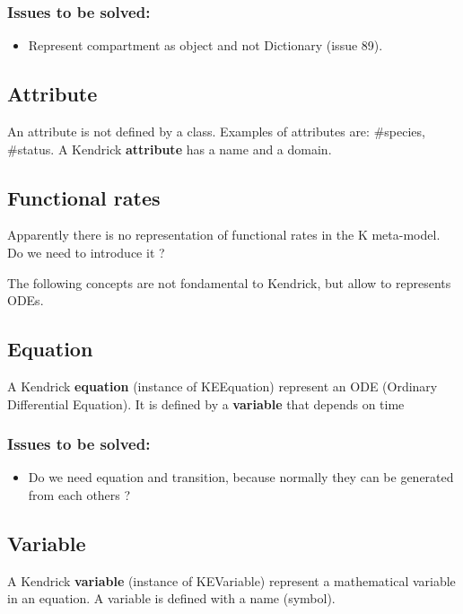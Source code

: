 \documentclass[11pt]{article}
\begin{document}
\subsubsection{Issues to be solved:}
\label{sec:orgb214871}
\begin{itemize}
\item Represent compartment as object and not Dictionary (issue 89).
\end{itemize}

\subsection{Attribute}
\label{sec:orgdf207ca}
An attribute is not defined by a class. Examples of attributes are: \#species, \#status.
A Kendrick \textbf{attribute} has a name and a domain.

\subsection{Functional rates}
\label{sec:org4dd5f83}
Apparently there is no representation of functional rates in the K meta-model.
Do we need to introduce it ?

The following concepts are not fondamental to Kendrick, but allow to represents ODEs.
\subsection{Equation}
\label{sec:org392f406}
A Kendrick \textbf{equation} (instance of KEEquation) represent an ODE (Ordinary Differential Equation). It is defined by a \textbf{variable} that depends on time 

\subsubsection{Issues to be solved:}
\label{sec:org19a4a5c}
\begin{itemize}
\item Do we need equation and transition, because normally they can be generated from each others ?
\end{itemize}

\subsection{Variable}
\label{sec:org5759923}
   A Kendrick \textbf{variable} (instance of KEVariable) represent a mathematical variable in an equation.
A variable is defined with a name (symbol).
\end{document}
